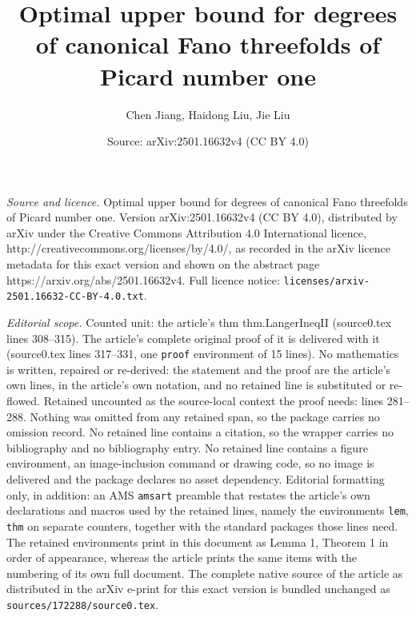 \documentclass[10pt,a4paper]{amsart}
\title{Optimal upper bound for degrees of canonical Fano threefolds of Picard number one}
\author{Chen Jiang, Haidong Liu, Jie Liu}
\date{Source: arXiv:2501.16632v4 (CC BY 4.0)}
\begin{document}
\maketitle

\noindent\emph{Source and licence.} Optimal upper bound for degrees of canonical Fano threefolds of Picard number one. Version arXiv:2501.16632v4 (CC BY 4.0), distributed by arXiv under the Creative Commons Attribution 4.0 International licence, http://creativecommons.org/licenses/by/4.0/, as recorded in the arXiv licence metadata for this exact version and shown on the abstract page https://arxiv.org/abs/2501.16632v4. Full licence notice: \texttt{licenses/arxiv-2501.16632-CC-BY-4.0.txt}.\par\smallskip

\noindent\textit{Editorial scope.} Counted unit: the article's thm thm.LangerIneqII (source0.tex lines 308--315). The article's complete original proof of it is delivered with it (source0.tex lines 317--331, one \texttt{proof} environment of 15 lines). No mathematics is written, repaired or re-derived: the statement and the proof are the article's own lines, in the article's own notation, and no retained line is substituted or re-flowed.  Retained uncounted as the source-local context the proof needs: lines 281--288.  Nothing was omitted from any retained span, so the package carries no omission record.  No retained line contains a citation, so the wrapper carries no bibliography and no bibliography entry.  No retained line contains a figure environment, an image-inclusion command or drawing code, so no image is delivered and the package declares no asset dependency.  Editorial formatting only, in addition: an AMS \texttt{amsart} preamble that restates the article's own declarations and macros used by the retained lines, namely the environments \texttt{lem}, \texttt{thm} on separate counters, together with the standard packages those lines need.  The retained environments print in this document as Lemma 1, Theorem 1 in order of appearance, whereas the article prints the same items with the numbering of its own full document.  The complete native source of the article as distributed in the arXiv e-print for this exact version is bundled unchanged as \texttt{sources/172288/source0.tex}.
\end{document}
